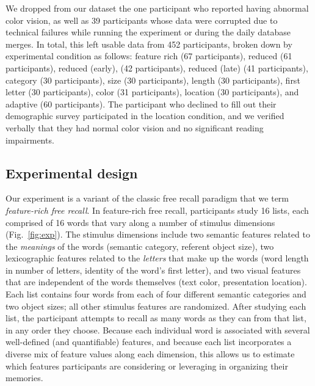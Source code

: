 \documentclass[11pt]{article}
\begin{document}
We dropped from our dataset the one participant who reported having abnormal
color vision, as well as 39 participants whose data were corrupted due to
technical failures while running the experiment or during the daily database
merges. In total, this left usable data from 452 participants, broken down by
experimental condition as follows: feature rich (67 participants), reduced (61
participants), reduced (early), (42 participants), reduced (late) (41
participants), category (30 participants), size (30 participants), length (30
participants), first letter (30 participants), color (31 participants),
location (30 participants), and adaptive (60 participants). The participant who
declined to fill out their demographic survey participated in the location
condition, and we verified verbally that they had normal color vision and no
significant reading impairments.




\subsection*{Experimental design}

Our experiment is a variant of the classic free recall paradigm that we term
\textit{feature-rich free recall}. In feature-rich free recall, participants
study 16 lists, each comprised of 16 words that vary along a number of stimulus
dimensions (Fig.~\ref{fig:exp}). The stimulus dimensions include two semantic
features related to the \textit{meanings} of the words (semantic category,
referent object size), two lexicographic features related to the
\textit{letters} that make up the words (word length in number of letters,
identity of the word's first letter), and two visual features that are
independent of the words themselves (text color, presentation location). Each
list contains four words from each of four different semantic categories and
two object sizes; all other stimulus features are randomized. After studying
each list, the participant attempts to recall as many words as they can from
that list, in any order they choose. Because each individual word is associated
with several well-defined (and quantifiable) features, and because each list
incorporates a diverse mix of feature values along each dimension, this allows
us to estimate which features participants are considering or leveraging in
organizing their memories.
\end{document}

